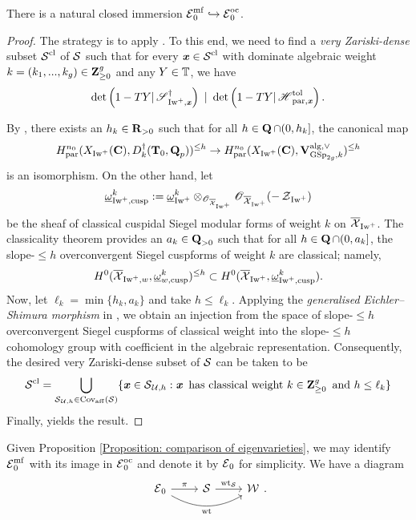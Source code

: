 \begin{Proposition}\label{Proposition: comparison of eigenvarieties}
There is a natural closed immersion $\calE_{0}^{\mf}\hookrightarrow \calE_{0}^{\oc}$.
\end{Proposition}
\begin{proof}
The strategy is to apply \cite[Theorem 5.1.2]{Hansen-PhD}. To this end, we need to find a \textit{very Zariski-dense} subset $\calS^{\cl}$ of $\calS$ such that for every $\bfitx\in \calS^{\cl}$ with dominate algebraic weight $k=(k_1, ..., k_g)\in \Z_{\geq 0}^{g}$ and any $Y\in \bbT$, we have $$\det\left(1-TY|\scrS_{\Iw^+, \bfitx}^{\dagger}\right)\,\,|\,\,\det\left(1-TY|\scrH_{\Par, \bfitx}^{\tol}\right).$$ 

By \cite[Theorem 4.3.2]{Wu-2020}, there exists an $h_{k}\in \R_{>0}$ such that for all $h\in \Q\cap (0, h_k]$, the canonical map $$H^{n_0}_{\Par}(X_{\Iw^+}(\C), D_{k}^{\dagger}(\T_0, \Q_p))^{\leq h}\rightarrow H_{\Par}^{n_0}(X_{\Iw^+}(\C), \V_{\GSp_{2g}, k}^{\alg, \vee})^{\leq h}$$ is an isomorphism. On the other hand, let 
$$\underline{\omega}_{\Iw^+, \cusp}^{k}:=\underline{\omega}_{\Iw^+}^{k}\otimes_{\scrO_{\overline{\calX}_{\Iw^+}}}\scrO_{\overline{\calX}_{\Iw^+}}(-\calZ_{\Iw^+})$$ be the sheaf of classical cuspidal Siegel modular forms of weight $k$ on $\overline{\calX}_{\Iw^+}$. The classicality theorem \cite[Theorem 7.1.1]{AIP-2015} provides an $a_k\in \Q_{>0}$ such that for all $h\in\Q\cap(0,a_k]$, the slope-$\leq h$ overconvergent Siegel cuspforms of weight $k$ are classical; namely, $$H^0(\overline{\calX}_{\Iw^+, w}, \underline{\omega}_{w, \cusp}^{k})^{\leq h}\subset H^0(\overline{\calX}_{\Iw^+}, \underline{\omega}_{\Iw^+, \cusp}^{k}).$$ Now, let $\ell_{k}=\min\{h_k, a_k\}$ and take $h\leq \ell_k$. Applying the \emph{generalised Eichler--Shimura morphism} in \cite[Theorem 3.8]{Hida_2002}, we obtain an injection from the space of slope-$\leq h$ overconvergent Siegel cuspforms of classical weight into the slope-$\leq h$ cohomology group with coefficient in the algebraic representation. Consequently, the desired very Zariski-dense subset of $\calS$ can be taken to be $$\calS^{\cl}=\bigcup_{\calS_{\calU, h}\in \Cov_{\mathrm{aff}}(\calS)}\{\bfitx\in \calS_{\calU, h}: \bfitx\text{ has classical weight }k\in \Z_{\geq 0}^{g}\text{ and } h\leq \ell_k\}$$
Finally, \cite[Theorem 5.1.2]{Hansen-PhD} yields the result. 
\end{proof}

Given Proposition \ref{Proposition: comparison of eigenvarieties}, we may identify $\calE_0^{\mf}$ with its image in $\calE_0^{\oc}$ and denote it by $\calE_0$ for simplicity. We have a diagram $$\begin{tikzcd}
\calE_0\arrow[r, "\pi"]\arrow[rr, bend right = 30, "\wt"'] & \calS\arrow[r, "\wt_{\calS}"] & \calW
\end{tikzcd}.$$ 


